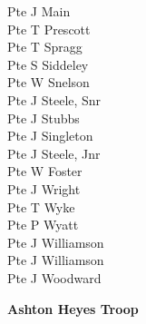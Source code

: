 \begin{multicols}{2}
  Pte J Main \\
  Pte T Prescott \\
  Pte T Spragg \\
  Pte S Siddeley \\
  Pte W Snelson \\
  Pte J Steele, Snr \\
  Pte J Stubbs \\
  Pte J Singleton \\
  Pte J Steele, Jnr \\
  Pte W Foster \\
  Pte J Wright \\
  Pte T Wyke \\
  Pte P Wyatt \\
  Pte J Williamson \\
  Pte J Williamson \\
  Pte J Woodward \\
\end{multicols}

\begin{center}
  \Large
  \textbf{Ashton Heyes Troop}
\end{center}

